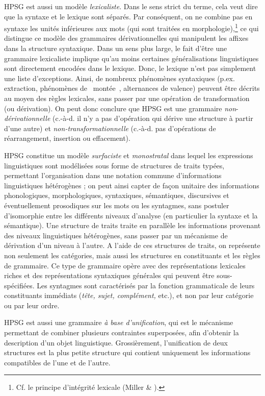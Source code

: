 HPSG est aussi un modèle \textit{lexicaliste}. Dans le sens strict du terme, cela veut dire que la syntaxe et le lexique sont séparés. Par conséquent, on ne combine pas en syntaxe les unités inférieures aux mots (qui sont traitées en morphologie),\footnote{Cf. le principe d'intégrité lexicale (Miller \& \citet{Sag1997}).}  ce qui distingue ce modèle des grammaires dérivationnelles qui manipulent les affixes dans la structure syntaxique. Dans un sens plus large, le fait d'être une grammaire lexicaliste implique qu'au moins certaines généralisations linguistiques sont directement encodées dans le lexique. Donc, le lexique n'est pas simplement une liste d'exceptions. Ainsi, de nombreux phénomènes syntaxiques (p.ex. extraction, phénomènes de {\guillemotleft}~montée~{\guillemotright}, alternances de valence) peuvent être décrits au moyen des règles lexicales, sans passer par une opération de transformation (ou dérivation). On peut donc conclure que HPSG est une grammaire \textit{non}-\textit{dérivationnelle} (c.-à-d. il n'y a pas d'opération qui dérive une structure à partir d'une autre) et \textit{non-transformationnelle} (c.-à-d. pas d'opérations de réarrangement, insertion ou effacement).

HPSG constitue un modèle \textit{surfaciste} et \textit{monostratal} dans lequel les expressions linguistiques sont modélisées sous forme de structures de traits typées, permettant l'organisation dans une notation commune d'informations linguistiques hétérogènes ; on peut ainsi capter de façon unitaire des informations phonologiques, morphologiques, syntaxiques, sémantiques, discursives et éventuellement prosodiques sur les mots ou les syntagmes, sans postuler d'isomorphie entre les différents niveaux d'analyse (en particulier la syntaxe et la sémantique). Une structure de traits traite en parallèle les informations provenant des niveaux linguistiques hétérogènes, sans passer par un mécanisme de dérivation d'un niveau à l'autre. A l'aide de ces structures de traits, on représente non seulement les catégories, mais aussi les structures en constituants et les règles de grammaire. Ce type de grammaire opère avec des représentations lexicales riches et des représentations syntaxiques générales qui peuvent être sous-spécifiées. Les syntagmes sont caractérisés par la fonction grammaticale de leurs constituants immédiats (\textit{tête, sujet, complément,} etc.), et non par leur catégorie ou par leur ordre.

HPSG est aussi une grammaire \textit{à base d'unification}, qui est le mécanisme permettant de combiner plusieurs contraintes superposées, afin d'obtenir la description d'un objet linguistique. Grossièrement, l'unification de deux structures est la plus petite structure qui contient uniquement les informations compatibles de l'une et de l'autre.

